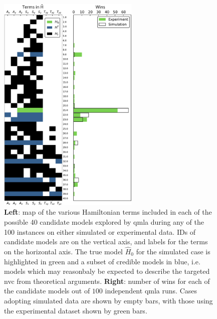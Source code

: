 \begin{figure}
    \begin{center}
        \includegraphics[width=0.6\textwidth]{experimental_study/figures/model_composition.pdf}
    \end{center}
    \caption[
        Models considered by QMLA for simulated/experimental nitrogen-vacancy centre data, and their win rates
    ]{
    \textbf{Left}: map of the various Hamiltonian terms included in each of the possible 40 candidate models explored by \gls{qmla}
    during any of the 100 \glspl{instance} on either simulated or experimental data.
    IDs of candidate models are on the vertical axis, and labels for the terms on the horizontal axis.
    The \gls{true model} $\hat{H}_0$ for the simulated case is highlighted in green and a subset of credible models in blue, 
    i.e. models which may reasonbaly be expected to describe the targeted \acrfull{nvc} from theoretical arguments.
    \textbf{Right}: number of wins for each of the candidate models out of $100$ independent \gls{qmla} \glspl{run}. 
    Cases adopting simulated data are shown by empty bars, with those using the experimental dataset shown by green bars.
    \figtableref
    } 
    \label{fig:nv_model_composition}
\end{figure}

